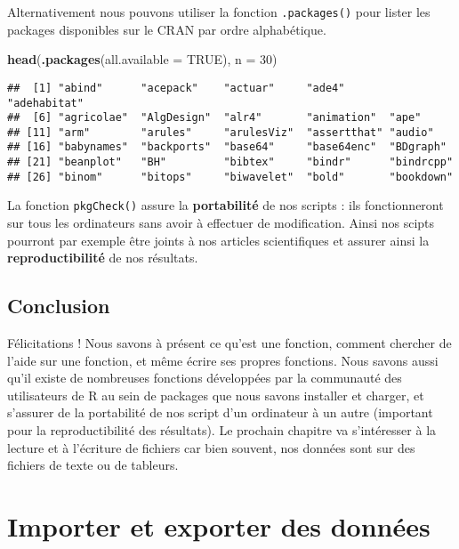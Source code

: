 \documentclass[]{book}
\newenvironment{Shaded}{\begin{snugshade}}{\end{snugshade}}
\newcommand{\KeywordTok}[1]{\textcolor[rgb]{0.13,0.29,0.53}{\textbf{#1}}}
\newcommand{\DataTypeTok}[1]{\textcolor[rgb]{0.13,0.29,0.53}{#1}}
\newcommand{\DecValTok}[1]{\textcolor[rgb]{0.00,0.00,0.81}{#1}}
\newcommand{\OtherTok}[1]{\textcolor[rgb]{0.56,0.35,0.01}{#1}}
\newcommand{\NormalTok}[1]{#1}
\theoremstyle{definition}
\theoremstyle{definition}
\theoremstyle{definition}
\theoremstyle{remark}
\begin{document}
Alternativement nous pouvons utiliser la fonction \texttt{.packages()}
pour lister les packages disponibles sur le CRAN par ordre alphabétique.

\begin{Shaded}
\begin{Highlighting}[]
\KeywordTok{head}\NormalTok{(}\KeywordTok{.packages}\NormalTok{(}\DataTypeTok{all.available =} \OtherTok{TRUE}\NormalTok{), }\DataTypeTok{n =} \DecValTok{30}\NormalTok{)}
\end{Highlighting}
\end{Shaded}

\begin{verbatim}
##  [1] "abind"      "acepack"    "actuar"     "ade4"       "adehabitat"
##  [6] "agricolae"  "AlgDesign"  "alr4"       "animation"  "ape"       
## [11] "arm"        "arules"     "arulesViz"  "assertthat" "audio"     
## [16] "babynames"  "backports"  "base64"     "base64enc"  "BDgraph"   
## [21] "beanplot"   "BH"         "bibtex"     "bindr"      "bindrcpp"  
## [26] "binom"      "bitops"     "biwavelet"  "bold"       "bookdown"
\end{verbatim}

La fonction \texttt{pkgCheck()} assure la \textbf{portabilité} de nos
scripts : ils fonctionneront sur tous les ordinateurs sans avoir à
effectuer de modification. Ainsi nos scipts pourront par exemple être
joints à nos articles scientifiques et assurer ainsi la
\textbf{reproductibilité} de nos résultats.

\section{Conclusion}\label{conclusion-4}

Félicitations ! Nous savons à présent ce qu'est une fonction, comment
chercher de l'aide sur une fonction, et même écrire ses propres
fonctions. Nous savons aussi qu'il existe de nombreuses fonctions
développées par la communauté des utilisateurs de R au sein de packages
que nous savons installer et charger, et s'assurer de la portabilité de
nos script d'un ordinateur à un autre (important pour la
reproductibilité des résultats). Le prochain chapitre va s'intéresser à
la lecture et à l'écriture de fichiers car bien souvent, nos données
sont sur des fichiers de texte ou de tableurs.

\hypertarget{import}{\chapter{Importer et exporter des
données}\label{import}}
\end{document}
